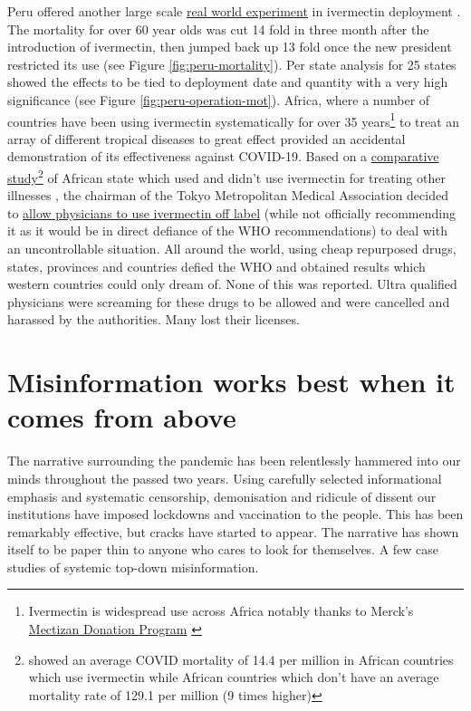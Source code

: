 \documentclass[11pt,a4paper,notitlepage]{report}
\begin{document}
Peru offered another large scale \href{ https://osf.io/9egh4/}{real world experiment} in ivermectin deployment \cite{Chamie2021}. The mortality for over 60 year olds was cut 14 fold in three month after the introduction of ivermectin, then jumped back up 13 fold once the new president restricted its use (see Figure \ref{fig:peru-mortality}). Per state analysis for 25 states showed the effects to be tied to deployment date and quantity with a very high significance (see Figure \ref{fig:peru-operation-mot}). Africa, where a number of countries have been using ivermectin systematically for over 35 years\footnote{Ivermectin is widespread use across Africa notably thanks to Merck's \href{https://www.merck.com/stories/mectizan/}{Mectizan Donation Program} \cite{merck06012021}} to treat an array of different tropical diseases to great effect provided an accidental demonstration of its effectiveness against COVID-19. Based on a \href{https://www.medrxiv.org/content/early/2021/03/26/2021.03.26.21254377.full.pdf}{comparative study}\footnote{\citet{Tanioka2021.03.26.21254377} showed an average COVID mortality of 14.4 per million in African countries which use ivermectin while African countries which don't have an average mortality rate of 129.1 per million (9 times higher)} of African state which used and didn’t use ivermectin for treating other illnesses \cite{Tanioka2021.03.26.21254377}, the chairman of the Tokyo Metropolitan Medical Association decided to \href{https://www.tokyo-np.co.jp/article/123988}{allow physicians to use ivermectin off label} \cite{tokyoweb13082021} (while not officially recommending it as it would be in direct defiance of the WHO recommendations) to deal with an uncontrollable situation. All around the world, using cheap repurposed drugs, states, provinces and countries defied the WHO and obtained results which western countries could only dream of. None of this was reported. Ultra qualified physicians were screaming for these drugs to be allowed and were cancelled and harassed by the authorities. Many lost their licenses. 

\section*{Misinformation works best when it comes from above}

The narrative surrounding the pandemic has been relentlessly hammered into our minds throughout the passed two years. Using carefully selected informational emphasis and systematic censorship, demonisation and ridicule of dissent our institutions have imposed lockdowns and vaccination to the people. This has been remarkably effective, but cracks have started to appear. The narrative has shown itself to be paper thin to anyone who cares to look for themselves. A few case studies of systemic top-down misinformation.
\end{document}
